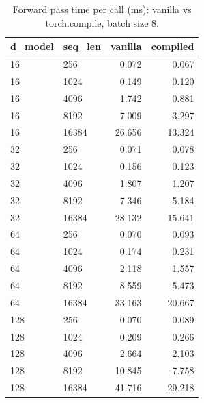 \begin{table}
\centering
\begin{tabular}{llrr}
\toprule
d\_model & seq\_len & vanilla & compiled \\
\midrule
16 & 256 & 0.072 & 0.067 \\
16 & 1024 & 0.149 & 0.120 \\
16 & 4096 & 1.742 & 0.881 \\
16 & 8192 & 7.009 & 3.297 \\
16 & 16384 & 26.656 & 13.324 \\
32 & 256 & 0.071 & 0.078 \\
32 & 1024 & 0.156 & 0.123 \\
32 & 4096 & 1.807 & 1.207 \\
32 & 8192 & 7.346 & 5.184 \\
32 & 16384 & 28.132 & 15.641 \\
64 & 256 & 0.070 & 0.093 \\
64 & 1024 & 0.174 & 0.231 \\
64 & 4096 & 2.118 & 1.557 \\
64 & 8192 & 8.559 & 5.473 \\
64 & 16384 & 33.163 & 20.667 \\
128 & 256 & 0.070 & 0.089 \\
128 & 1024 & 0.209 & 0.266 \\
128 & 4096 & 2.664 & 2.103 \\
128 & 8192 & 10.845 & 7.758 \\
128 & 16384 & 41.716 & 29.218 \\
\bottomrule
\end{tabular}
\caption{Forward pass time per call (ms): vanilla vs torch.compile, batch size 8.}
\label{tab:attn_forward_compare}
\end{table}
